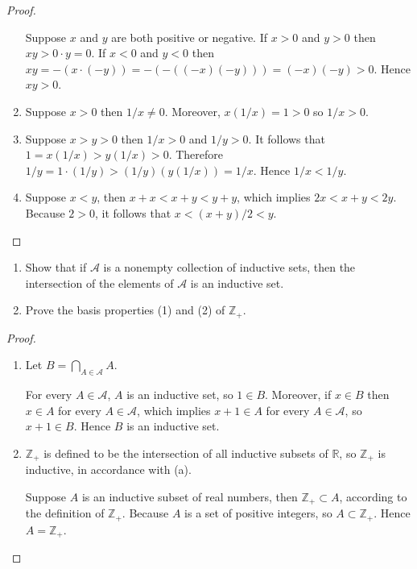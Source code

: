 \begin{proof}
\begin{enumerate}[label={(\alph*)}]
              Suppose $x$ and $y$ are both positive or negative. If $x > 0$ and $y > 0$ then $xy > 0\cdot y = 0$. If $x < 0$ and $y < 0$ then $xy = -(x\cdot (-y)) = -(-((-x)(-y))) = (-x)(-y) > 0$. Hence $xy > 0$.
        \item Suppose $x > 0$ then $1/x\ne 0$. Moreover, $x(1/x) = 1 > 0$ so $1/x > 0$.
        \item Suppose $x > y > 0$ then $1/x > 0$ and $1/y > 0$. It follows that $1 = x(1/x) > y(1/x) > 0$. Therefore $1/y = 1\cdot(1/y) > (1/y)(y(1/x)) = 1/x$. Hence $1/x < 1/y$.
        \item Suppose $x < y$, then $x + x < x + y < y + y$, which implies $2x < x + y < 2y$. Because $2 > 0$, it follows that $x < (x + y)/2 < y$.
    \end{enumerate}
\end{proof}

\begin{exercise}\label{chapter1:section4:exercise3}
    \begin{enumerate}[label={(\alph*)}]
        \item Show that if $\mathscr{A}$ is a nonempty collection of inductive sets, then the intersection of the elements of $\mathscr{A}$ is an inductive set.
        \item Prove the basis properties (1) and (2) of $\mathbb{Z}_{+}$.
    \end{enumerate}
\end{exercise}

\begin{proof}
    \begin{enumerate}[label={(\alph*)}]
        \item Let $B = \bigcap_{A\in\mathscr{A}}A$.

              For every $A\in\mathscr{A}$, $A$ is an inductive set, so $1\in B$. Moreover, if $x\in B$ then $x\in A$ for every $A\in\mathscr{A}$, which implies $x + 1\in A$ for every $A\in\mathscr{A}$, so $x + 1\in B$. Hence $B$ is an inductive set.
        \item $\mathbb{Z}_{+}$ is defined to be the intersection of all inductive subsets of $\mathbb{R}$, so $\mathbb{Z}_{+}$ is inductive, in accordance with (a).

              Suppose $A$ is an inductive subset of real numbers, then $\mathbb{Z}_{+} \subset A$, according to the definition of $\mathbb{Z}_{+}$. Because $A$ is a set of positive integers, so $A\subset \mathbb{Z}_{+}$. Hence $A = \mathbb{Z}_{+}$.
    \end{enumerate}
\end{proof}

